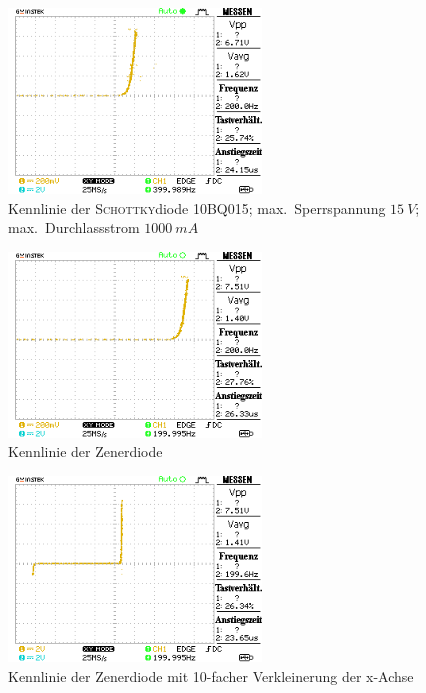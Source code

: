 \documentclass[a4paper,10pt]{article}
\numberwithin{equation}{section}
\begin{document}
\begin{figure}[h]
	\centering
	\includegraphics[width=0.6\textwidth]{data/Kennlinie_a1_d2.BMP.png}
	\caption{Kennlinie der \textsc{Schottky}diode 10BQ015; max.\ Sperrspannung $\SI{15}{V}$; max.\ Durchlassstrom $\SI{1000}{mA}$}
	\label{fig:2.2}
\end{figure}
\begin{figure}[h]
	\centering
	\includegraphics[width=0.6\textwidth]{data/Kennlinie_a1_zd.BMP.png}
	\caption{Kennlinie der Zenerdiode}
	\label{fig:2.3}
\end{figure}
\begin{figure}[h]
	\centering
	\includegraphics[width=0.6\textwidth]{data/Kennlinie_a1_zd_fern.BMP.png}
	\caption{Kennlinie der Zenerdiode mit 10-facher Verkleinerung der x-Achse}
	\label{fig:2.4}
\end{figure}
\clearpage
\end{document}
